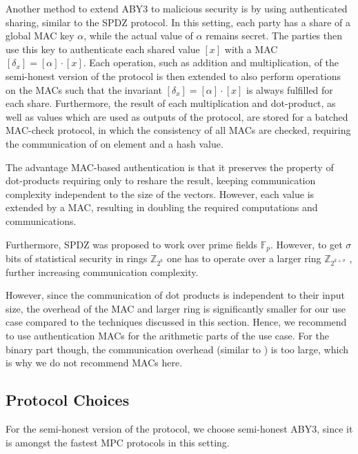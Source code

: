 \documentclass[a4paper,11pt,
]{article}
\newcommand{\F}{\ensuremath{\mathbb{F}}\xspace}
\newcommand{\Z}{\ensuremath{\mathbb{Z}}\xspace}
\newcommand{\shared}[1]{\ensuremath{[{#1}]}}
\begin{document}
Another method to extend ABY3 to malicious security is by using authenticated sharing, similar to the SPDZ \cite{DBLP:conf/crypto/DamgardPSZ12} protocol. In this setting, each party has a share of a global MAC key $\alpha$, while the actual value of $\alpha$ remains secret. The parties then use this key to authenticate each shared value $\shared{x}$ with a MAC $\shared{\delta_x} = \shared{\alpha} \cdot \shared{x}$. Each operation, such as addition and multiplication, of the semi-honest version of the protocol is then extended to also perform operations on the MACs such that the invariant $\shared{\delta_x} = \shared{\alpha} \cdot \shared{x}$ is always fulfilled for each share. Furthermore, the result of each multiplication and dot-product, as well as values which are used as outputs of the protocol, are stored for a batched MAC-check protocol, in which the consistency of all MACs are checked, requiring the communication of on element and a hash value.

The advantage MAC-based authentication is that it preserves the property of dot-products requiring only to reshare the result, keeping communication complexity independent to the size of the vectors. However, each value is extended by a MAC, resulting in doubling the required computations and communications.

Furthermore, SPDZ was proposed to work over prime fields $\F_p$. However, to get $\sigma$ bits of statistical security in rings $\Z_{2^k}$ one has to operate over a larger ring $\Z_{2^{k+\sigma}}$ \cite{DBLP:conf/acns/AbspoelD0N21, DBLP:conf/uss/Dalskov0K21}, further increasing communication complexity.

However, since the communication of dot products is independent to their input size, the overhead of the MAC and larger ring is significantly smaller for our use case compared to the techniques discussed in this section. Hence, we recommend to use authentication MACs for the arithmetic parts of the use case. For the binary part though, the communication overhead (similar to ) is too large, which is why we do not recommend MACs here.


\subsection{Protocol Choices} \label{sec::choice}

For the semi-honest version of the protocol, we choose semi-honest ABY3, since it is amongst the fastest MPC protocols in this setting.
\end{document}
